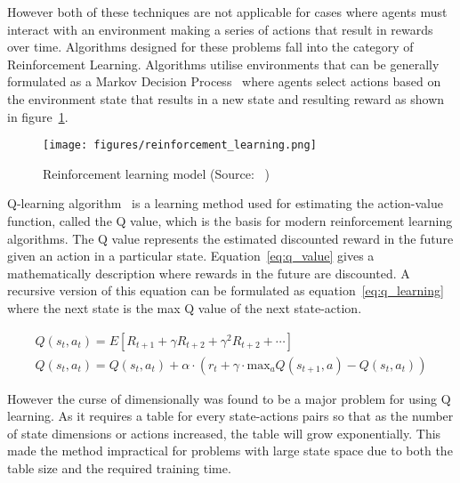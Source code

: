 However both of these techniques are not applicable for cases where agents must interact with an environment making a
series of actions that result in rewards over time. Algorithms designed for these problems fall into the category of
Reinforcement Learning. Algorithms utilise environments that can be generally formulated as a Markov Decision
Process~\citep{Bel} where agents select actions based on the environment state that results in a new state and resulting
reward as shown in figure~\ref{fig:reinforcement_learning}.

\begin{figure}[h]
    \centering
    \texttt{[image: figures/reinforcement\_learning.png]}
    \caption{Reinforcement learning model (Source: ~\cite{Sutton1998})}
    \label{fig:reinforcement_learning}
\end{figure}

Q-learning algorithm~\cite{watkins1992q-learning} is a learning method used for estimating the action-value function,
called the Q value, which is the basis for modern reinforcement learning algorithms. The Q value represents the estimated
discounted reward in the future given an action in a particular state. Equation~\eqref{eq:q_value} gives a
mathematically description where rewards in the future are discounted. A recursive version of this equation can be
formulated as equation~\eqref{eq:q_learning} where the next state is the max Q value of the next state-action.

\begin{align}
    Q(s_t, a_t) = E[R_{t+1} + \gamma R_{t+2} + \gamma^2 R_{t+2} + \cdots ] \label{eq:q_value} \\
    Q(s_t, a_t) = Q(s_t, a_t) + \alpha \cdot (r_t + \gamma \cdot \text{max}_a Q(s_{t+1} , a) - Q(s_t, a_t) ) \label{eq:q_learning}
\end{align}

However the curse of dimensionally was found to be a major problem for using Q learning. As it requires a table for
every state-actions pairs so that as the number of state dimensions or actions increased, the table will grow
exponentially. This made the method impractical for problems with large state space due to both the table
size and the required training time.


